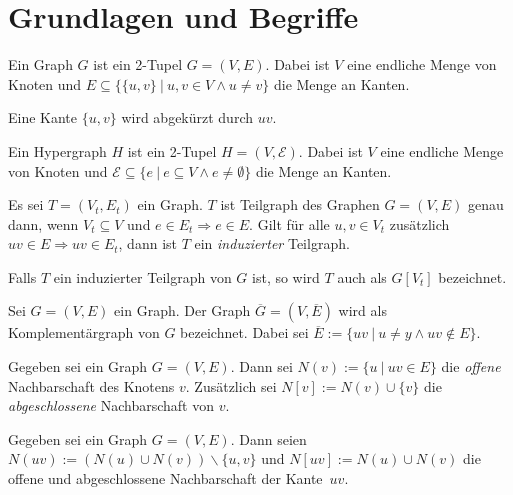 \chapter{Grundlagen und Begriffe}


\begin{mydef}[Graph]Ein Graph $G$ ist ein 2-Tupel $G=(V,E)$. Dabei ist
 $V$ eine endliche Menge von Knoten und
 $E \subseteq \{\{u,v\} \ |\ u,v \in V \wedge u \neq v\}$ die Menge an Kanten.

Eine Kante $\{u,v\}$ wird abgekürzt durch $uv$.
\end{mydef}

\begin{mydef}[Hypergraph]
Ein Hypergraph $H$ ist ein 2-Tupel $H=(V,\mathcal{E})$.  Dabei ist
 $V$ eine endliche Menge von Knoten und
 $\mathcal{E} \subseteq \{e \ |\ e \subseteq V \wedge e \neq \emptyset\}$ die Menge an Kanten.
\end{mydef}

\begin{mydef}[Teilgraph]
Es sei $T=(V_t,E_t)$ ein Graph. $T$ ist Teilgraph des Graphen $G=(V,E)$ genau
dann, wenn $V_t \subseteq V$ und $e \in E_t \Rightarrow e \in E$.
Gilt für alle $u,v \in V_t$ zusätzlich $uv \in E \Rightarrow uv \in E_t$, dann
ist $T$ ein \emph{induzierter} Teilgraph.

Falls $T$ ein induzierter Teilgraph von $G$ ist, so wird $T$ auch als $G[V_t]$ bezeichnet.
\end{mydef}

\begin{mydef}[Komplementärgraph]
Sei $G=(V,E)$ ein Graph. Der Graph $\overline{G}=(V,\overline{E})$ wird 
als Komplementärgraph von $G$ bezeichnet. Dabei sei $\overline{E}:=\{uv\ |\ u \neq y \wedge uv \notin E\}$.
\end{mydef}

\begin{mydef}
Gegeben sei ein Graph $G=(V,E)$. Dann sei $N(v):=\{u\ |\ uv \in E\}$ die \emph{offene} Nachbarschaft des Knotens $v$. Zusätzlich sei $N[v]:=N(v) \cup \{v\}$ die \emph{abgeschlossene} Nachbarschaft von $v$.
\end{mydef}

\begin{mydef}
Gegeben sei ein Graph $G=(V,E)$. Dann seien $N(uv):=(N(u) \cup N(v)) \backslash \{u,v\}$ und $N[uv]:=N(u) \cup N(v)$ die offene und abgeschlossene Nachbarschaft der Kante~$uv$.
\end{mydef}

